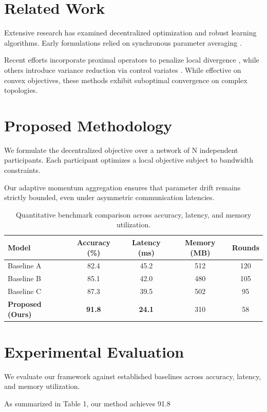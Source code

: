 \documentclass[journal]{IEEEtran}
\begin{document}
\section{Related Work}
Extensive research has examined decentralized optimization and robust learning algorithms. Early formulations relied on synchronous parameter averaging \cite{mcmahan2017communication}.

Recent efforts incorporate proximal operators to penalize local divergence \cite{li2020federated}, while others introduce variance reduction via control variates \cite{karimireddy2020scaffold}. While effective on convex objectives, these methods exhibit suboptimal convergence on complex topologies.

\section{Proposed Methodology}
We formulate the decentralized objective over a network of N independent participants. Each participant optimizes a local objective subject to bandwidth constraints.

Our adaptive momentum aggregation ensures that parameter drift remains strictly bounded, even under asymmetric communication latencies.

\begin{table}[t]
\centering
\caption{Quantitative benchmark comparison across accuracy, latency, and memory utilization.}
\label{tab:benchmarks}
\begin{tabular}{lcccc}
\toprule
\textbf{Model} & \textbf{Accuracy (\%)} & \textbf{Latency (ms)} & \textbf{Memory (MB)} & \textbf{Rounds} \\
\midrule
Baseline A & 82.4 & 45.2 & 512 & 120 \\
Baseline B & 85.1 & 42.0 & 480 & 105 \\
Baseline C & 87.3 & 39.5 & 502 & 95 \\
\textbf{Proposed (Ours)} & \textbf{91.8} & \textbf{24.1} & 310 & 58 \\
\bottomrule
\end{tabular}
\end{table}

\section{Experimental Evaluation}
We evaluate our framework against established baselines across accuracy, latency, and memory utilization.

As summarized in Table 1, our method achieves 91.8%
\end{document}
